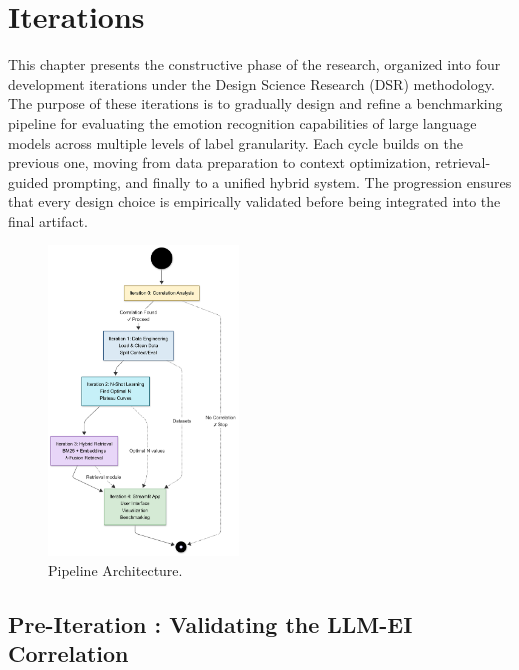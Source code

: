 \vspace{-2cm} %
\chapter{Iterations}
\label{chap:Iterations}
\vspace{-1cm} %

This chapter presents the constructive phase of the research, organized into four development iterations under the Design Science Research (DSR) methodology. The purpose of these iterations is to gradually design and refine a benchmarking pipeline for evaluating the emotion recognition capabilities of large language models across multiple levels of label granularity. Each cycle builds on the previous one, moving from data preparation to context optimization, retrieval-guided prompting, and finally to a unified hybrid system. The progression ensures that every design choice is empirically validated before being integrated into the final artifact.
\begin{figure}[htbp]
    \centering
    \includegraphics[width=0.45\textwidth, keepaspectratio]{Images/PipelineOverall.png}
    \caption{Pipeline Architecture.}
    \label{fig:pipeline_overview}
\end{figure}
\clearpage
\section{Pre-Iteration : Validating the LLM-EI Correlation}
\label{sec:iteration0}

